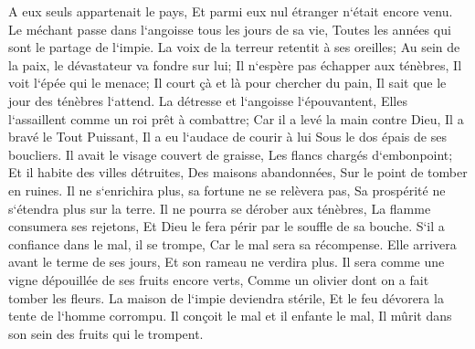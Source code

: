 \verse A eux seuls appartenait le pays, Et parmi eux nul étranger n`était encore venu. 
\verse Le méchant passe dans l`angoisse tous les jours de sa vie, Toutes les années qui sont le partage de l`impie. 
\verse La voix de la terreur retentit à ses oreilles; Au sein de la paix, le dévastateur va fondre sur lui; 
\verse Il n`espère pas échapper aux ténèbres, Il voit l`épée qui le menace; 
\verse Il court çà et là pour chercher du pain, Il sait que le jour des ténèbres l`attend. 
\verse La détresse et l`angoisse l`épouvantent, Elles l`assaillent comme un roi prêt à combattre; 
\verse Car il a levé la main contre Dieu, Il a bravé le Tout Puissant, 
\verse Il a eu l`audace de courir à lui Sous le dos épais de ses boucliers. 
\verse Il avait le visage couvert de graisse, Les flancs chargés d`embonpoint; 
\verse Et il habite des villes détruites, Des maisons abandonnées, Sur le point de tomber en ruines. 
\verse Il ne s`enrichira plus, sa fortune ne se relèvera pas, Sa prospérité ne s`étendra plus sur la terre. 
\verse Il ne pourra se dérober aux ténèbres, La flamme consumera ses rejetons, Et Dieu le fera périr par le souffle de sa bouche. 
\verse S`il a confiance dans le mal, il se trompe, Car le mal sera sa récompense. 
\verse Elle arrivera avant le terme de ses jours, Et son rameau ne verdira plus. 
\verse Il sera comme une vigne dépouillée de ses fruits encore verts, Comme un olivier dont on a fait tomber les fleurs. 
\verse La maison de l`impie deviendra stérile, Et le feu dévorera la tente de l`homme corrompu. 
\verse Il conçoit le mal et il enfante le mal, Il mûrit dans son sein des fruits qui le trompent. 


